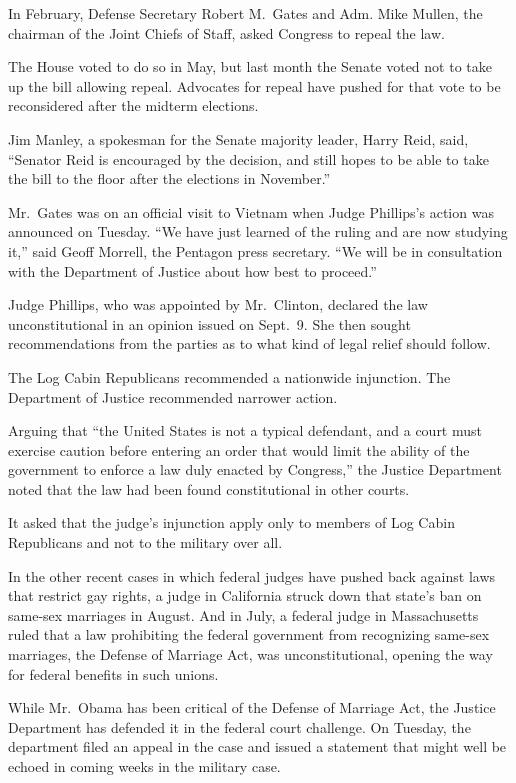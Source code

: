 ﻿\documentclass[12pt]{article}
\begin{document}
In February, Defense Secretary Robert M.~Gates and Adm. Mike Mullen, the chairman of the Joint
Chiefs of Staff, asked Congress to repeal the law.

The House voted to do so in May, but last month the Senate voted not to take up the bill allowing
repeal. Advocates for repeal have pushed for that vote to be reconsidered after the midterm
elections.

Jim Manley, a spokesman for the Senate majority leader, Harry Reid, said, ``Senator Reid is
encouraged by the decision, and still hopes to be able to take the bill to the floor after the
elections in November.''

Mr.~Gates was on an official visit to Vietnam when Judge Phillips's action was announced on Tuesday.
``We have just learned of the ruling and are now studying it,'' said Geoff Morrell, the Pentagon
press secretary. ``We will be in consultation with the Department of Justice about how best to
proceed.''

Judge Phillips, who was appointed by Mr.~Clinton, declared the law unconstitutional in an opinion
issued on Sept.~9. She then sought recommendations from the parties as to what kind of legal relief
should follow.

The Log Cabin Republicans recommended a nationwide injunction. The Department of Justice recommended
narrower action.

Arguing that ``the United States is not a typical defendant, and a court must exercise caution
before entering an order that would limit the ability of the government to enforce a law duly
enacted by Congress,'' the Justice Department noted that the law had been found constitutional in
other courts.

It asked that the judge's injunction apply only to members of Log Cabin Republicans and not to the
military over all.

In the other recent cases in which federal judges have pushed back against laws that restrict gay
rights, a judge in California struck down that state's ban on same-sex marriages in August. And in
July, a federal judge in Massachusetts ruled that a law prohibiting the federal government from
recognizing same-sex marriages, the Defense of Marriage Act, was unconstitutional, opening the way
for federal benefits in such unions.

While Mr.~Obama has been critical of the Defense of Marriage Act, the Justice Department has
defended it in the federal court challenge. On Tuesday, the department filed an appeal in the case
and issued a statement that might well be echoed in coming weeks in the military case.
\end{document}
